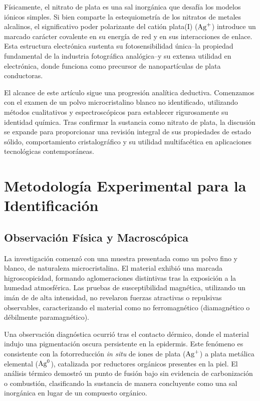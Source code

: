 \documentclass[pdflatex,sn-mathphys-num,draft]{sn-jnl}
\theoremstyle{thmstyleone}%
\theoremstyle{thmstyletwo}%
\theoremstyle{thmstylethree}%
\begin{document}
Físicamente, el nitrato de plata es una sal inorgánica que desafía los modelos
iónicos simples. Si bien comparte la estequiometría de los nitratos de metales
alcalinos, el significativo poder polarizante del catión plata(I) ($\ce{Ag+}$)
introduce un marcado carácter covalente en su energía de red y en sus
interacciones de enlace. Esta estructura electrónica sustenta su fotosensibilidad
única--la propiedad fundamental de la industria fotográfica analógica--y su
extensa utilidad en electrónica, donde funciona como precursor de nanopartículas
de plata conductoras.

El alcance de este artículo sigue una progresión analítica deductiva. Comenzamos
con el examen de un polvo microcristalino blanco no identificado, utilizando
métodos cualitativos y espectroscópicos para establecer rigurosamente su
identidad química. Tras confirmar la sustancia como nitrato de plata, la
discusión se expande para proporcionar una revisión integral de sus propiedades
de estado sólido, comportamiento cristalográfico y su utilidad multifacética en
aplicaciones tecnológicas contemporáneas.

\section{Metodología Experimental para la Identificación}
\label{sec:methodology}

\subsection{Observación Física y Macroscópica}
La investigación comenzó con una muestra presentada como un polvo fino y blanco,
de naturaleza microcristalina. El material exhibió una marcada higroscopicidad,
formando aglomeraciones distintivas tras la exposición a la humedad atmosférica.
Las pruebas de susceptibilidad magnética, utilizando un imán de  de alta
intensidad, no revelaron fuerzas atractivas o repulsivas observables,
caracterizando el material como no ferromagnético (diamagnético o débilmente
paramagnético).

Una observación diagnóstica ocurrió tras el contacto dérmico, donde el material
indujo una pigmentación oscura persistente en la epidermis. Este fenómeno es
consistente con la fotorreducción \textit{in situ} de iones de plata
($\ce{Ag+}$) a plata metálica elemental ($\ce{Ag^0}$), catalizada por reductores
orgánicos presentes en la piel. El análisis térmico demostró un punto de fusión
bajo sin evidencia de carbonización o combustión, clasificando la sustancia de
manera concluyente como una sal inorgánica en lugar de un compuesto orgánico.
\end{document}
